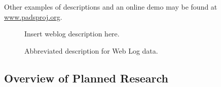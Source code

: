 \documentclass[11pt]{article}
\begin{document}
Other examples of \pads{} descriptions and an online demo may be
found at \url{www.padsproj.org}.

\begin{figure}[t]

%

Insert weblog description here.

\caption{Abbreviated \pads{} description for Web Log data.}
\label{figure:dibbler}
\end{figure}



% 


% 

\subsection{Overview of Planned Research}
\label{ssec:sow}
\end{document}
